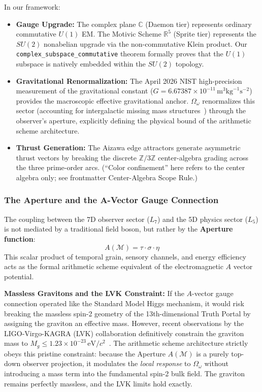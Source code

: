 In our framework:
\begin{itemize}
    \item \textbf{Gauge Upgrade:} The complex plane $\mathbb{C}$ (Daemon tier) represents ordinary commutative $U(1)$ EM. The Motivic Scheme $\mathbb{R}^5$ (Sprite tier) represents the $SU(2)$ nonabelian upgrade via the non-commutative Klein product. Our \texttt{complex\_subspace\_commutative} theorem formally proves that the $U(1)$ subspace is natively embedded within the $SU(2)$ topology.
    \item \textbf{Gravitational Renormalization:} The April 2026 NIST high-precision measurement of the gravitational constant ($G = 6.67387 \times 10^{-11} \, \text{m}^3 \text{kg}^{-1} \text{s}^{-2}$) provides the macroscopic effective gravitational anchor. $\Omega_\omega$ renormalizes this sector (accounting for intergalactic missing mass structures~\cite{WHIM2018}) through the observer's aperture, explicitly defining the physical bound of the arithmetic scheme architecture.
    \item \textbf{Thrust Generation:} The Aizawa edge attractors generate asymmetric thrust vectors by breaking the discrete $\mathbb{Z}/3\mathbb{Z}$ center-algebra grading across the three prime-order arcs. (``Color confinement'' here refers to the center algebra only; see frontmatter Center-Algebra Scope Rule.)
\end{itemize}

\subsubsection{The Aperture and the A-Vector Gauge Connection}

The coupling between the 7D observer sector ($L_7$) and the 5D physics sector ($L_5$) is not mediated by a traditional field boson, but rather by the \textbf{Aperture function}:
\begin{equation}
    A(\mathcal{M}) = \tau \cdot \sigma \cdot \eta
\end{equation}
This scalar product of temporal grain, sensory channels, and energy efficiency acts as the formal arithmetic scheme equivalent of the electromagnetic $A$ vector potential. 

\textbf{Massless Gravitons and the LVK Constraint:} If the $A$-vector gauge connection operated like the Standard Model Higgs mechanism, it would risk breaking the massless spin-2 geometry of the 13th-dimensional Truth Portal by assigning the graviton an effective mass. However, recent observations by the LIGO-Virgo-KAGRA (LVK) collaboration definitively constrain the graviton mass to $M_g \leq 1.23 \times 10^{-23} \, \text{eV}/c^2$~\cite{LVK_GravitonMass}. The arithmetic scheme architecture strictly obeys this pristine constraint: because the Aperture $A(\mathcal{M})$ is a purely top-down observer projection, it modulates the \emph{local response} to $\Omega_\omega$ without introducing a mass term into the fundamental spin-2 bulk field. The graviton remains perfectly massless, and the LVK limits hold exactly.

